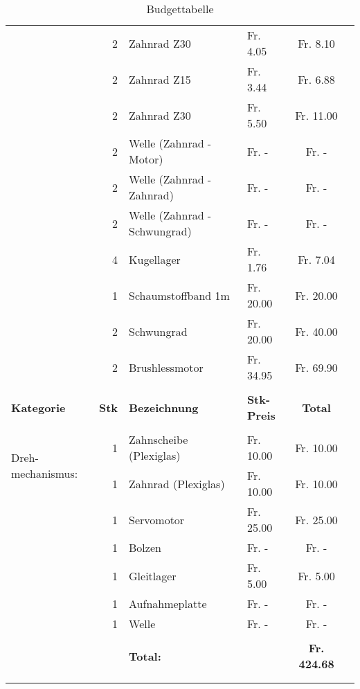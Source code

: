 \begin{longtable}{p{1.7cm}rllcc}
               & 2     & Zahnrad Z30 	              &  Fr. 4.05  &  Fr. 8.10  \\
               & 2     & Zahnrad Z15 	        	  &  Fr. 3.44  &  Fr. 6.88  \\
               & 2     & Zahnrad Z30 	         	  &  Fr. 5.50  &  Fr. 11.00 \\
               & 2     & Welle (Zahnrad - Motor)      &  Fr. -     &  Fr. -     \\
               & 2     & Welle (Zahnrad - Zahnrad)    &  Fr. -     &  Fr. -     \\
               & 2     & Welle (Zahnrad - Schwungrad) &  Fr. -     &  Fr. -     \\
               & 4     & Kugellager                   &  Fr. 1.76  &  Fr. 7.04  \\
               & 1     & Schaumstoffband 1m           &  Fr. 20.00 &  Fr. 20.00 \\
               & 2     & Schwungrad                   &  Fr. 20.00 &  Fr. 40.00 \\
               & 2     & Brushlessmotor               &  Fr. 34.95 &  Fr. 69.90 \\
               &       &                              &            &            \\
    \newpage
    \textbf{Kategorie} & \textbf{Stk} & \textbf{Bezeichnung} & \textbf{Stk-Preis}
    & \textbf{Total} \\
    \hline     &       &                              &            &            \\
    \multirow{2}{1.7cm}{Dreh-mechanismus:} 
               & 1     & Zahnscheibe (Plexiglas)      &  Fr. 10.00 &  Fr. 10.00 \\
               & 1     & Zahnrad (Plexiglas)          &  Fr. 10.00 &  Fr. 10.00 \\
               & 1     & Servomotor                   &  Fr. 25.00 &  Fr. 25.00 \\
               & 1     & Bolzen                       &  Fr. -     &  Fr. -     \\
               & 1     & Gleitlager                   &  Fr. 5.00  &  Fr. 5.00  \\
               & 1     & Aufnahmeplatte               &  Fr. -     &  Fr. -     \\
               & 1     & Welle                        &  Fr. -     &  Fr. -     \\
               &       &                              &            &            \\
               &       & \textbf{Total:} & \textbf{} & \textbf{ Fr. 424.68 }    \\
               &       &                              &            &            \\
               
       \caption{Budgettabelle}
       \label{tab:Kostentabelle}
    \end{longtable}
